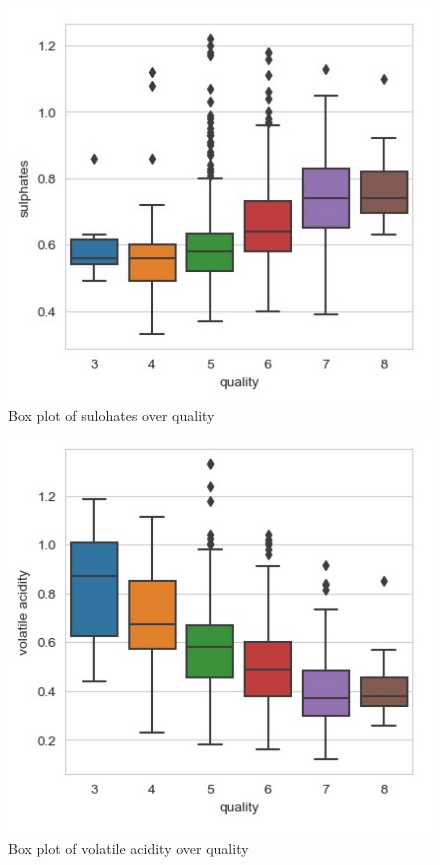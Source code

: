 \documentclass[conference]{IEEEtran}
\begin{document}
	\begin{figure}[h]
	\label{fig:foo}
	\begin{center}
	\includegraphics[scale=0.55]{s.jpg}
	\caption{Box plot of sulohates over quality}
	\end{center}
	\end{figure}
	
	\begin{figure}[h]
	\label{fig:foo}
	\begin{center}
	\includegraphics[scale=0.55]{v.jpg}
	\caption{Box plot of volatile acidity over quality}
	\end{center}
	\end{figure}
	
\end{document}
